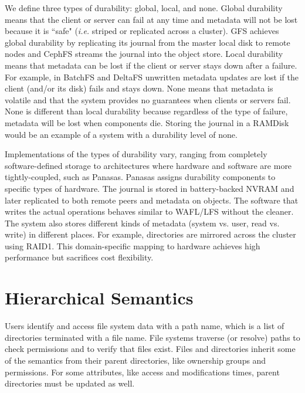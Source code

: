 We define three types of durability: global, local, and none.  Global
durability means that the client or server can fail at any time and metadata
will not be lost because it is ``safe" ({\it i.e.} striped or replicated across
a cluster). GFS achieves global durability by replicating its journal from the
master local disk to remote nodes and CephFS streams the journal into the
object store. Local durability means that metadata can be lost if the client or
server stays down after a failure. For example, in BatchFS and DeltaFS
unwritten metadata updates are lost if the client (and/or its disk) fails and
stays down.  None means that metadata is volatile and that the system provides
no guarantees when clients or servers fail.  None is different than local
durability because regardless of the type of failure, metadata will be lost
when components die. Storing the journal in a RAMDisk would be an example of a
system with a durability level of none.

Implementations of the types of durability vary, ranging from completely
software-defined storage to architectures where hardware and software are more
tightly-coupled, such as Panasas. Panasas assigns durability components to
specific types of hardware. The journal is stored in battery-backed NVRAM and
later replicated to both remote peers and metadata on objects. The software
that writes the actual operations behaves similar to WAFL/LFS without the
cleaner. The system also stores different kinds of metadata (system vs. user,
read vs. write) in different places. For example, directories are mirrored
across the cluster using RAID1. This domain-specific mapping to hardware
achieves high performance but sacrifices cost flexibility.

\section{Hierarchical Semantics}

Users identify and access file system data with a path name, which is a list of
directories terminated with a file name.  File systems traverse (or resolve)
paths to check permissions and to verify that files exist. Files and
directories inherit some of the semantics from their parent directories, like
ownership groups and permissions. For some attributes, like access and
modifications times, parent directories must be updated as well. 

